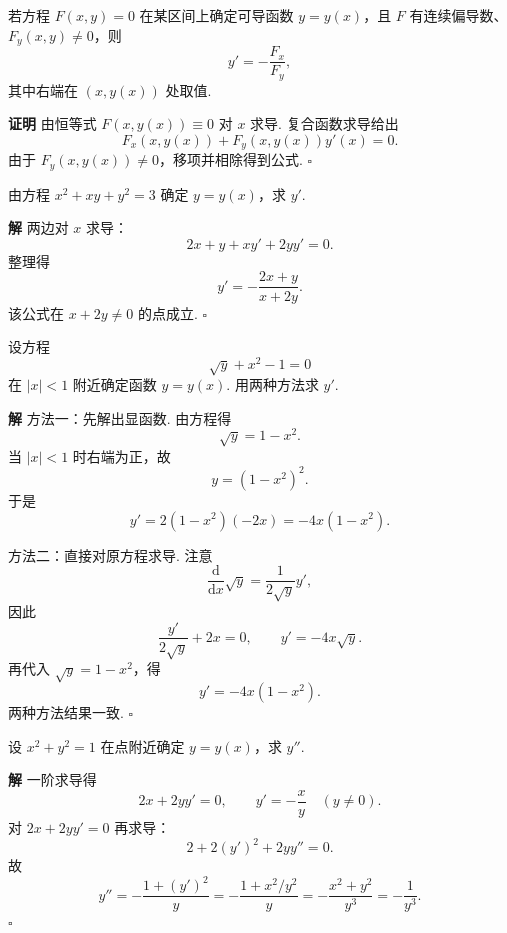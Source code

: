 \documentclass[fontset=fandol]{ctexart}
\newenvironment{proofdetail}{\par\noindent\textbf{证明}\quad}{\hfill$\square$\par\vspace{0.8em}}
\newenvironment{solution}{\par\noindent\textbf{解}\quad}{\hfill$\square$\par\vspace{0.8em}}
\newcommand{\dd}{\mathrm{d}}
\begin{document}
\begin{center}
\end{center}

\begin{proposition}[隐函数一阶求导]
若方程 $F(x,y)=0$ 在某区间上确定可导函数 $y=y(x)$，且 $F$ 有连续偏导数、$F_y(x,y)\neq0$，则
\[
y'=-\frac{F_x}{F_y},
\]
其中右端在 $(x,y(x))$ 处取值.
\end{proposition}
\begin{proofdetail}
由恒等式 $F(x,y(x))\equiv0$ 对 $x$ 求导. 复合函数求导给出
\[
F_x(x,y(x))+F_y(x,y(x))y'(x)=0.
\]
由于 $F_y(x,y(x))\neq0$，移项并相除得到公式.
\end{proofdetail}

\begin{example}[隐函数一阶导数]
由方程 $x^2+xy+y^2=3$ 确定 $y=y(x)$，求 $y'$.
\end{example}
\begin{solution}
两边对 $x$ 求导：
\[
2x+y+xy'+2yy'=0.
\]
整理得
\[
y'=-\frac{2x+y}{x+2y}.
\]
该公式在 $x+2y\neq0$ 的点成立.
\end{solution}

\begin{example}[先说明隐函数再求导]
设方程
\[
\sqrt{y}+x^2-1=0
\]
在 $|x|<1$ 附近确定函数 $y=y(x)$. 用两种方法求 $y'$.
\end{example}
\begin{solution}
方法一：先解出显函数. 由方程得
\[
\sqrt{y}=1-x^2.
\]
当 $|x|<1$ 时右端为正，故
\[
y=(1-x^2)^2.
\]
于是
\[
y'=2(1-x^2)(-2x)=-4x(1-x^2).
\]

方法二：直接对原方程求导. 注意
\[
\frac{\dd}{\dd x}\sqrt{y}
=\frac{1}{2\sqrt{y}}y',
\]
因此
\[
\frac{y'}{2\sqrt{y}}+2x=0,
\qquad
y'=-4x\sqrt{y}.
\]
再代入 $\sqrt{y}=1-x^2$，得
\[
y'=-4x(1-x^2).
\]
两种方法结果一致.
\end{solution}

\begin{example}[隐函数二阶导数]
设 $x^2+y^2=1$ 在点附近确定 $y=y(x)$，求 $y''$.
\end{example}
\begin{solution}
一阶求导得
\[
2x+2yy'=0,\qquad y'=-\frac{x}{y}\quad(y\neq0).
\]
对 $2x+2yy'=0$ 再求导：
\[
2+2(y')^2+2yy''=0.
\]
故
\[
y''=-\frac{1+(y')^2}{y}=-\frac{1+x^2/y^2}{y}
=-\frac{x^2+y^2}{y^3}=-\frac1{y^3}.
\]
\end{solution}
\end{document}
